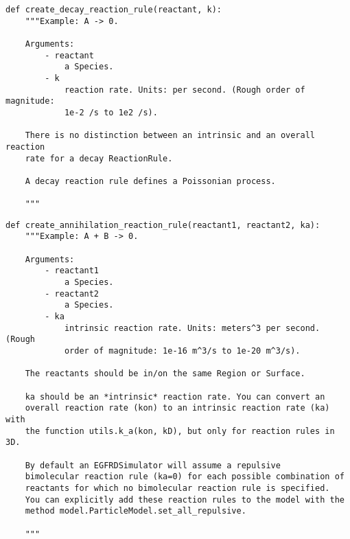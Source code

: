 \documentclass[a4paper,10pt]{article}
\begin{document}
\begin{verbatim}
def create_decay_reaction_rule(reactant, k):
    """Example: A -> 0.

    Arguments:
        - reactant
            a Species.
        - k
            reaction rate. Units: per second. (Rough order of magnitude: 
            1e-2 /s to 1e2 /s).

    There is no distinction between an intrinsic and an overall reaction 
    rate for a decay ReactionRule.

    A decay reaction rule defines a Poissonian process.

    """
\end{verbatim}

\begin{verbatim}
def create_annihilation_reaction_rule(reactant1, reactant2, ka):
    """Example: A + B -> 0.

    Arguments:
        - reactant1
            a Species.
        - reactant2
            a Species.
        - ka
            intrinsic reaction rate. Units: meters^3 per second. (Rough 
            order of magnitude: 1e-16 m^3/s to 1e-20 m^3/s).

    The reactants should be in/on the same Region or Surface.

    ka should be an *intrinsic* reaction rate. You can convert an 
    overall reaction rate (kon) to an intrinsic reaction rate (ka) with 
    the function utils.k_a(kon, kD), but only for reaction rules in 3D.

    By default an EGFRDSimulator will assume a repulsive 
    bimolecular reaction rule (ka=0) for each possible combination of 
    reactants for which no bimolecular reaction rule is specified. 
    You can explicitly add these reaction rules to the model with the 
    method model.ParticleModel.set_all_repulsive.

    """
\end{verbatim}
\end{document}
